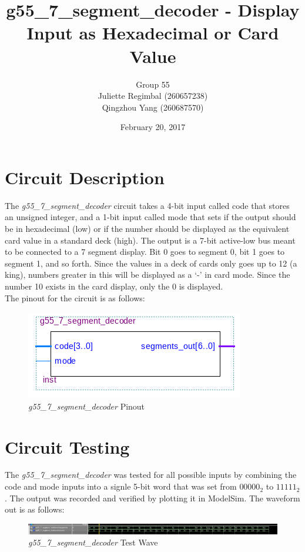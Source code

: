 \documentclass[12pt]{article}
\title{g55\_7\_segment\_decoder - Display Input as Hexadecimal or Card Value}
\author{Group 55\\Juliette Regimbal (260657238)\\Qingzhou Yang (260687570)}
\date{February 20, 2017}
\begin{document}
\maketitle
\setlength{\parindent}{0ex}
\section{Circuit Description}
The \textit{g55\_7\_segment\_decoder} circuit takes a 4-bit input called code that stores an unsigned integer, and a 1-bit input called mode that sets if the output should be in hexadecimal (low) or if the number should be displayed as the equivalent card value in a standard deck (high). The output is a 7-bit active-low bus meant to be connected to a 7 segment display. Bit 0 goes to segment 0, bit 1 goes to segment 1, and so forth. Since the values in a deck of cards only goes up to 12 (a king), numbers greater in this will be displayed as a `-' in card mode. Since the number 10 exists in the card display, only the 0 is displayed.\\

The pinout for the circuit is as follows:
\begin{figure}[h!t]
\centering
	\includegraphics[scale=0.5]{graphics/7_seg_schematic.png}
	\caption{\textit{g55\_7\_segment\_decoder} Pinout}
\end{figure}

\section{Circuit Testing}
The \textit{g55\_7\_segment\_decoder} was tested for all possible inputs by combining the code and mode inputs into a signle 5-bit word that was set from $00000_2$ to $11111_2$. The output was recorded and verified by plotting it in ModelSim. The waveform out is as follows:
\begin{figure}[h!t]
\centering
\includegraphics[scale=0.3]{graphics/7_seg_wave.png}
\caption{\textit{g55\_7\_segment\_decoder} Test Wave}
\end{figure}
\end{document}
